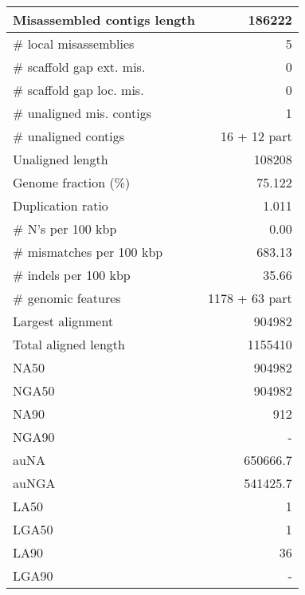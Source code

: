 \documentclass[12pt,a4paper]{article}
\begin{document}
\begin{table}[ht]
\begin{center}
\begin{tabular}{|l*{1}{|r}|}
Misassembled contigs length & 186222 \\ \hline
\# local misassemblies & 5 \\ \hline
\# scaffold gap ext. mis. & 0 \\ \hline
\# scaffold gap loc. mis. & 0 \\ \hline
\# unaligned mis. contigs & 1 \\ \hline
\# unaligned contigs & 16 + 12 part \\ \hline
Unaligned length & 108208 \\ \hline
Genome fraction (\%) & 75.122 \\ \hline
Duplication ratio & 1.011 \\ \hline
\# N's per 100 kbp & 0.00 \\ \hline
\# mismatches per 100 kbp & 683.13 \\ \hline
\# indels per 100 kbp & 35.66 \\ \hline
\# genomic features & 1178 + 63 part \\ \hline
Largest alignment & 904982 \\ \hline
Total aligned length & 1155410 \\ \hline
NA50 & 904982 \\ \hline
NGA50 & 904982 \\ \hline
NA90 & 912 \\ \hline
NGA90 & - \\ \hline
auNA & 650666.7 \\ \hline
auNGA & 541425.7 \\ \hline
LA50 & 1 \\ \hline
LGA50 & 1 \\ \hline
LA90 & 36 \\ \hline
LGA90 & - \\ \hline
\end{tabular}
\end{center}
\end{table}
\end{document}

